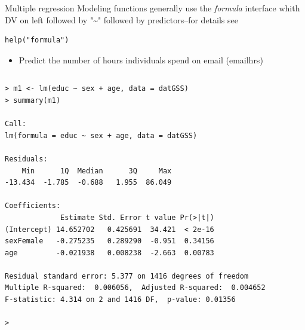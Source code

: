 \documentclass[table,smaller]{beamer}
\begin{document}
\begin{frame}[fragile,label=sec-6-5]{Multiple regression}
 Modeling functions generally use the \emph{formula} interface whith DV on left followed by "\textasciitilde{}" followed by predictors--for details see
\begin{verbatim}
help("formula")
\end{verbatim}

\begin{itemize}
\item Predict the number of hours individuals spend on email (emailhrs)
\end{itemize}
\vspace{-.5em}
\begin{columns}
\begin{block}{}
\begin{verbatim}
> m1 <- lm(educ ~ sex + age, data = datGSS)
> summary(m1)

Call:
lm(formula = educ ~ sex + age, data = datGSS)

Residuals:
    Min      1Q  Median      3Q     Max 
-13.434  -1.785  -0.688   1.955  86.049 

Coefficients:
             Estimate Std. Error t value Pr(>|t|)
(Intercept) 14.652702   0.425691  34.421  < 2e-16
sexFemale   -0.275235   0.289290  -0.951  0.34156
age         -0.021938   0.008238  -2.663  0.00783

Residual standard error: 5.377 on 1416 degrees of freedom
Multiple R-squared:  0.006056,	Adjusted R-squared:  0.004652 
F-statistic: 4.314 on 2 and 1416 DF,  p-value: 0.01356

>
\end{verbatim}
\end{block}
\end{columns}
\vspace{.5em}
\end{frame}
\end{document}
